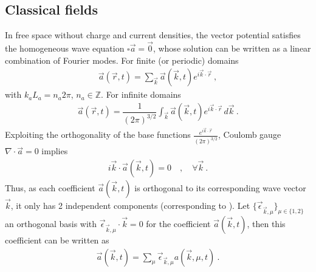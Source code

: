\documentclass[letterpaper,10pt,english]{jupyterBook}
\begin{document}
\subsection{Classical fields}
\label{\detokenize{ch/quantum-mechanics/qft/photons-coulomb:classical-fields}}\label{\detokenize{ch/quantum-mechanics/qft/photons-coulomb:quantum-mechanics-qft-photons-coulomb-classical}}
\sphinxAtStartPar
In free space without charge and current densities, the vector potential satisfies the homogeneous wave equation \(\square \vec{a} = \vec{0}\), whose solution can be written as a linear combination of Fourier modes. For finite (or periodic) domains
\begin{equation*}
\begin{split}\vec{a}(\vec{r},t) = \sum_{\vec{k}} \vec{a}(\vec{k},t) e^{i \vec{k} \cdot \vec{r}} \ ,\end{split}
\end{equation*}
\sphinxAtStartPar
with \(k_a L_a = n_a 2 \pi\), \(n_a \in \mathbb{Z}\). For infinite domains
\begin{equation*}
\begin{split}\vec{a}(\vec{r},t) = \dfrac{1}{(2 \pi )^{3/2}} \int_{\vec{k}} \vec{a}(\vec{k},t) e^{i \vec{k} \cdot \vec{r}} \, d \vec{k} \ .\end{split}
\end{equation*}
\sphinxAtStartPar
{} Exploiting the orthogonality of the base functions \(\frac{e^{i \vec{k} \cdot \vec{r}}}{(2\pi)^{3/2}}\), Coulomb gauge \(\nabla \cdot \vec{a} = 0\) implies
\begin{equation*}
\begin{split}i \vec{k} \cdot \vec{a}(\vec{k}, t) = 0 \quad , \quad \forall \vec{k} \ .\end{split}
\end{equation*}
\sphinxAtStartPar
Thus, as each coefficient \(\vec{a}(\vec{k},t)\) is orthogonal to its corresponding wave vector \(\vec{k}\), it only has 2 independent components (corresponding to ). Let \(\{ \vec{\epsilon}_{\vec{k},\mu} \}_{\mu \in \{1, 2\}}\) an orthogonal basis \sphinxhyphen{} with \(\vec{\epsilon}_{\vec{k},\mu} \cdot \vec{k} = 0\) \sphinxhyphen{} for the coefficient \(\vec{a}(\vec{k},t)\), then this coefficient can be written as
\begin{equation*}
\begin{split}\vec{a}(\vec{k}, t) = \sum_{\mu} \vec{\epsilon}_{\vec{k}, \mu} a(\vec{k},\mu, t) \ .\end{split}
\end{equation*}
\end{document}
